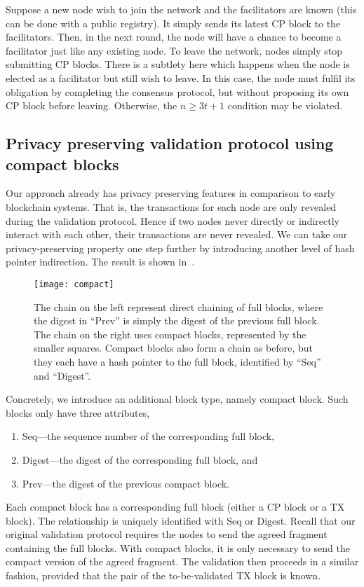 Suppose a new node wish to join the network and the facilitators are known (this can be done with a public registry).
It simply sends its latest CP block to the facilitators.
Then, in the next round, the node will have a chance to become a facilitator just like any existing node.
To leave the network, nodes simply stop submitting CP blocks.
There is a subtlety here which happens when the node is elected as a facilitator but still wish to leave.
In this case, the node must fulfil its obligation by completing the consensus protocol,
but without proposing its own CP block before leaving.
Otherwise, the $n \ge 3t + 1$ condition may be violated.

\subsection{Privacy preserving validation protocol using compact blocks}
\label{sec:compact}
Our approach already has privacy preserving features in comparison to early block\-chain systems.
That is, the transactions for each node are only revealed during the validation protocol.
Hence if two nodes never directly or indirectly interact with each other,
their transactions are never revealed.
We can take our privacy-preserving property one step further by introducing another level of hash pointer indirection.
The result is shown in~.

\begin{figure}
    \texttt{[image: compact]}
    \centering
    \caption{The chain on the left represent direct chaining of full blocks,
    where the digest in ``Prev'' is simply the digest of the previous full block.
    The chain on the right uses compact blocks, represented by the smaller squares.
    Compact blocks also form a chain as before, but they each have a hash pointer to the full block, identified by ``Seq'' and ``Digest''.}
    \label{fig:compact}
\end{figure}

Concretely, we introduce an additional block type,
namely compact block.
Such blocks only have three attributes,
\begin{enumerate}
\item Seq---the sequence number of the corresponding full block,
\item Digest---the digest of the corresponding full block, and
\item Prev---the digest of the previous compact block.
\end{enumerate}
Each compact block has a corresponding full block (either a CP block or a TX block).
The relationship is uniquely identified with Seq or Digest.
Recall that our original validation protocol requires the nodes to send the agreed fragment containing the full blocks.
With compact blocks, it is only necessary to send the compact version of the agreed fragment.
The validation then proceeds in a similar fashion,
provided that the pair of the to-be-validated TX block is known.

